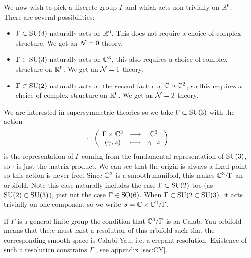         We now wish to pick a discrete group $\Gamma$ and which acts non-trivially on $\mathbb{R}^6$. There are several possibilities:
        \begin{itemize}
            \item $\Gamma\subset\text{SU}(4)$ naturally acts on $\mathbb{R}^6$. This does not require a choice of complex structure. We get an $\mathcal{N}=0$ theory.
            \item $\Gamma\subset\text{SU}(3)$ naturally acts on $\mathbb{C}^3$, this also requires a choice of complex structure on $\mathbb{R}^6$. We get an $\mathcal{N}=1$ theory.
            \item $\Gamma\subset\text{SU}(2)$ naturally acts on the second factor of $\mathbb{C}\times\mathbb{C}^2$, so this requires a choice of complex structure on $\mathbb{R}^6$. We get an $\mathcal{N}=2$ theory.
        \end{itemize}

        We are interested in supersymmetric theories so we take $\Gamma\subset\text{SU}(3)$ with the action
        \begin{equation}
            \cdot:\left(
            \begin{array}{ccc}
                \Gamma\times\mathbb{C}^3 & \longrightarrow & \mathbb{C}^3 \\
                (\gamma,z) & \longmapsto & \gamma\cdot z
            \end{array}
            \right)
        \end{equation}
        is the representation of $\Gamma$ coming from the fundamental representation of $\text{SU}(3)$, so $\cdot$ is just the matrix product. We can see that the origin is always a fixed point so this action is never free. Since $\mathbb{C}^3$ is a smooth manifold, this makes $\mathbb{C}^3/\Gamma$ an orbifold. Note this case naturally includes the case $\Gamma\subset\text{SU}(2)$ too (as $\text{SU}(2)\subset\text{SU}(3)$), just not the case $\Gamma\in\text{SO}(6)$. When $\Gamma\subset\text{SU}(2\subset\text{SU}(3)$, it acts trivially on one component so we write $S=\mathbb{C}\times\mathbb{C}^2/\Gamma$.

        If $\Gamma$ is a general finite group the condition that $\mathbb{C}^3/\Gamma$ is an Calabi-Yau orbifold means that there must exist a resolution of this orbifold such that the corresponding smooth space is Calabi-Yau, i.e. a crepant resolution. Existence of such a resolution constrains $\Gamma$ , see appendix \ref{sec:CY}.

